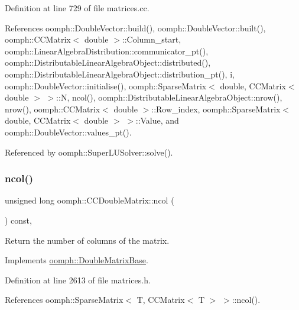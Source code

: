 Definition at line 729 of file matrices.\+cc.



References oomph\+::\+Double\+Vector\+::build(), oomph\+::\+Double\+Vector\+::built(), oomph\+::\+C\+C\+Matrix$<$ double $>$\+::\+Column\+\_\+start, oomph\+::\+Linear\+Algebra\+Distribution\+::communicator\+\_\+pt(), oomph\+::\+Distributable\+Linear\+Algebra\+Object\+::distributed(), oomph\+::\+Distributable\+Linear\+Algebra\+Object\+::distribution\+\_\+pt(), i, oomph\+::\+Double\+Vector\+::initialise(), oomph\+::\+Sparse\+Matrix$<$ double, C\+C\+Matrix$<$ double $>$ $>$\+::N, ncol(), oomph\+::\+Distributable\+Linear\+Algebra\+Object\+::nrow(), nrow(), oomph\+::\+C\+C\+Matrix$<$ double $>$\+::\+Row\+\_\+index, oomph\+::\+Sparse\+Matrix$<$ double, C\+C\+Matrix$<$ double $>$ $>$\+::\+Value, and oomph\+::\+Double\+Vector\+::values\+\_\+pt().



Referenced by oomph\+::\+Super\+L\+U\+Solver\+::solve().

\mbox{\label{classoomph_1_1CCDoubleMatrix_aa38cc544ab30f9318161763e13c20957}} 
\subsubsection{\texorpdfstring{ncol()}{ncol()}}
{\footnotesize\ttfamily unsigned long oomph\+::\+C\+C\+Double\+Matrix\+::ncol (\begin{DoxyParamCaption}{ }\end{DoxyParamCaption}) const\hspace{0.3cm}{\ttfamily [inline]}, {\ttfamily [virtual]}}



Return the number of columns of the matrix. 



Implements \hyperlink{classoomph_1_1DoubleMatrixBase_a253feffbf1db1976cdd86c6134c50abe}{oomph\+::\+Double\+Matrix\+Base}.



Definition at line 2613 of file matrices.\+h.



References oomph\+::\+Sparse\+Matrix$<$ T, C\+C\+Matrix$<$ T $>$ $>$\+::ncol().



